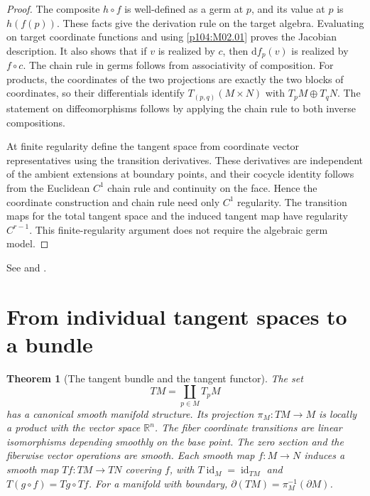 \documentclass[11pt,oneside,openany]{book}
\newtheorem{theorem}{Theorem}[chapter]
\theoremstyle{definition}
\theoremstyle{remark}
\newcommand{\R}{\mathbb R}
\newcommand{\dd}{\mathrm d}
\DeclareMathOperator{\id}{id}
\begin{document}
\begin{proof}
The composite \(h\circ f\) is well-defined as a germ at \(p\),
and its value at \(p\) is \(h(f(p))\). These facts give the
derivation rule on the target algebra. Evaluating on target
coordinate functions and using \cref{p104:M02.01} proves the
Jacobian description. It also shows that if \(v\) is realized
by \(c\), then \(\dd f_p(v)\) is realized by \(f\circ c\).
The chain rule in germs follows from associativity of
composition. For products, the coordinates of the two
projections are exactly the two blocks of coordinates,
so their differentials identify \(T_{(p,q)}(M\times N)\)
with \(T_pM\oplus T_qN\). The statement on diffeomorphisms
follows by applying the chain rule to both inverse
compositions.

At finite regularity define the tangent space from
coordinate vector representatives using the transition
derivatives. These derivatives are independent of the
ambient extensions at boundary points, and their
cocycle identity follows from the Euclidean \(C^1\)
chain rule and continuity on the face. Hence the
coordinate construction and chain rule need only
\(C^1\) regularity. The transition maps for the total
tangent space and the induced tangent map have
regularity \(C^{r-1}\). This finite-regularity argument
does not require the algebraic germ model.
\end{proof}

See \cite[pp.~55--65]{lee} and \cite[Sections~8 and 10]{tu}.

\section{From individual tangent spaces to a bundle}

\begin{theorem}[The tangent bundle and the tangent functor]\label{p104:M02.04}
The set
\[
  TM=\coprod_{p\in M} T_pM
\]
has a canonical smooth manifold structure. Its projection
\(\pi_M:TM\to M\) is locally a product with the vector
space \(\R^n\). The fiber coordinate transitions are linear
isomorphisms depending smoothly on the base point.
The zero section and the fiberwise vector operations
are smooth. Each smooth map \(f:M\to N\) induces a
smooth map \(Tf:TM\to TN\) covering \(f\), with
\(T\id_M=\id_{TM}\) and \(T(g\circ f)=Tg\circ Tf\).
For a manifold with boundary,
\(\partial(TM)=\pi_M^{-1}(\partial M)\).
\end{theorem}
\end{document}
